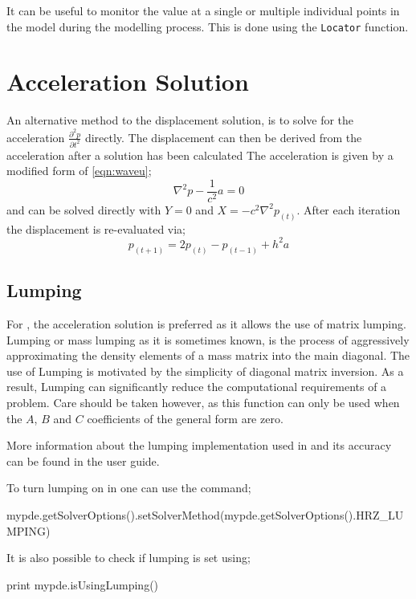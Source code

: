 It can be useful to monitor the value at a single or multiple individual points
in the model during the modelling process. This is done using 
the \verb!Locator! function.


\section{Acceleration Solution}

An alternative method to the displacement solution, is to solve for the
acceleration $\frac{\partial ^2 p}{\partial t^2}$ directly. The displacement can
then be derived from the acceleration after a solution has been calculated
The acceleration is given by a modified form of \autoref{eqn:waveu};
\begin{equation}
  \nabla ^2 p - \frac{1}{c^2} a = 0
\label{eqn:wavea}
\end{equation}
and can be solved directly with $Y=0$ and $X=-c^2 \nabla ^2 p_{(t)}$.
After each iteration the displacement is re-evaluated via;
\begin{equation}
 p_{(t+1)}=2p_{(t)} - p_{(t-1)} + h^2a
\end{equation}

\subsection{Lumping}
For \esc, the acceleration solution is preferred as it allows the use of matrix
lumping. Lumping or mass lumping as it is sometimes known, is the process of
aggressively approximating the density elements of a mass matrix into the main
diagonal. The use of Lumping is motivated by the simplicity of diagonal matrix
 inversion. As a result, Lumping can significantly reduce the computational
requirements of a problem. Care should be taken however, as this
function can only be used when the $A$, $B$ and $C$ coefficients of the
general form are zero. 

More information about the lumping implementation used in \esc and its accuracy
can be found in the user guide.

To turn lumping on in \esc one can use the command;
\begin{python}
 mypde.getSolverOptions().setSolverMethod(mypde.getSolverOptions().HRZ_LUMPING)
\end{python}
It is also possible to check if lumping is set using;
\begin{python}
  print mypde.isUsingLumping()
\end{python}

